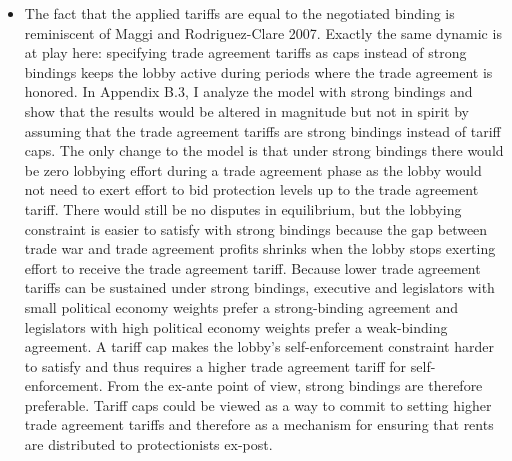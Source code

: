 \documentclass[12pt]{article}
\begin{document}
\begin{itemize}
\begin{itemize}
				\item The fact that the applied tariffs are equal to the negotiated binding is reminiscent of Maggi and Rodriguez-Clare 2007. Exactly the same dynamic is at play here: specifying trade agreement tariffs as caps instead of strong bindings keeps the lobby active during periods where the trade agreement is honored. In Appendix B.3, I analyze the model with strong bindings and show that the results would be altered in magnitude but not in spirit by assuming that the trade agreement tariffs are strong bindings instead of tariff caps. The only change to the model is that under strong bindings there would be zero lobbying effort during a trade agreement phase as the lobby would not need to exert effort to bid protection levels up to the trade agreement tariff. There would still be no disputes in equilibrium, but the lobbying constraint is easier to satisfy with strong bindings because the gap between trade war and trade agreement profits shrinks when the lobby stops exerting effort to receive the trade agreement tariff. Because lower trade agreement tariffs can be sustained under strong bindings, executive and legislators with small political economy weights prefer a strong-binding agreement and legislators with high political economy weights prefer a weak-binding agreement. A tariff cap makes the lobby's self-enforcement constraint harder to satisfy and thus requires a higher trade agreement tariff for self-enforcement. From the ex-ante point of view, strong bindings are therefore preferable. Tariff caps could be viewed as a way to commit to setting higher trade agreement tariffs and therefore as a mechanism for ensuring that rents are distributed to protectionists ex-post.


\end{itemize}
\end{itemize}
\end{document}
